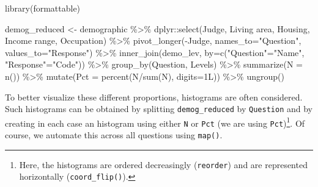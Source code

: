 \documentclass[
]{book}
\newenvironment{Shaded}{\begin{snugshade}}{\end{snugshade}}
\newcommand{\AttributeTok}[1]{\textcolor[rgb]{0.77,0.63,0.00}{#1}}
\newcommand{\FunctionTok}[1]{\textcolor[rgb]{0.00,0.00,0.00}{#1}}
\newcommand{\NormalTok}[1]{#1}
\newcommand{\OtherTok}[1]{\textcolor[rgb]{0.56,0.35,0.01}{#1}}
\newcommand{\SpecialCharTok}[1]{\textcolor[rgb]{0.00,0.00,0.00}{#1}}
\newcommand{\StringTok}[1]{\textcolor[rgb]{0.31,0.60,0.02}{#1}}
\begin{document}
\begin{Shaded}
\begin{Highlighting}[]
\FunctionTok{library}\NormalTok{(formattable)}

\NormalTok{demog\_reduced }\OtherTok{\textless{}{-}}\NormalTok{ demographic }\SpecialCharTok{\%\textgreater{}\%} 
\NormalTok{  dplyr}\SpecialCharTok{::}\FunctionTok{select}\NormalTok{(Judge, }\StringTok{\textasciigrave{}}\AttributeTok{Living area}\StringTok{\textasciigrave{}}\NormalTok{, Housing, }\StringTok{\textasciigrave{}}\AttributeTok{Income range}\StringTok{\textasciigrave{}}\NormalTok{, }\StringTok{\textasciigrave{}}\AttributeTok{Occupation}\StringTok{\textasciigrave{}}\NormalTok{) }\SpecialCharTok{\%\textgreater{}\%} 
  \FunctionTok{pivot\_longer}\NormalTok{(}\SpecialCharTok{{-}}\NormalTok{Judge, }\AttributeTok{names\_to=}\StringTok{"Question"}\NormalTok{, }\AttributeTok{values\_to=}\StringTok{"Response"}\NormalTok{) }\SpecialCharTok{\%\textgreater{}\%} 
  \FunctionTok{inner\_join}\NormalTok{(demo\_lev, }\AttributeTok{by=}\FunctionTok{c}\NormalTok{(}\StringTok{"Question"}\OtherTok{=}\StringTok{"Name"}\NormalTok{, }\StringTok{"Response"}\OtherTok{=}\StringTok{"Code"}\NormalTok{)) }\SpecialCharTok{\%\textgreater{}\%} 
  \FunctionTok{group\_by}\NormalTok{(Question, Levels) }\SpecialCharTok{\%\textgreater{}\%} 
  \FunctionTok{summarize}\NormalTok{(}\AttributeTok{N =} \FunctionTok{n}\NormalTok{()) }\SpecialCharTok{\%\textgreater{}\%} 
  \FunctionTok{mutate}\NormalTok{(}\AttributeTok{Pct =} \FunctionTok{percent}\NormalTok{(N}\SpecialCharTok{/}\FunctionTok{sum}\NormalTok{(N), }\AttributeTok{digits=}\NormalTok{1L)) }\SpecialCharTok{\%\textgreater{}\%} 
  \FunctionTok{ungroup}\NormalTok{()}
\end{Highlighting}
\end{Shaded}

To better visualize these different proportions, histograms are often considered. Such histograms can be obtained by splitting \texttt{demog\_reduced} by \texttt{Question} and by creating in each case an histogram using either \texttt{N} or \texttt{Pct} (we are using \texttt{Pct})\footnote{Here, the histograms are ordered decreasingly (\texttt{reorder}) and are represented horizontally (\texttt{coord\_flip()}).}. Of course, we automate this across all questions using \texttt{map()}.
\end{document}
